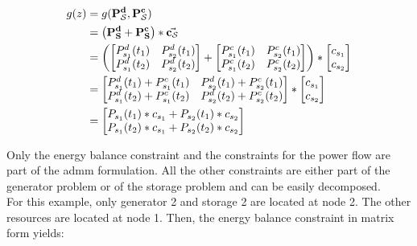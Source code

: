 \begin{subequations}
	\begin{align}
		g(z) &= g(\vb{P_\mathcal{S}^d}, \vb{P_\mathcal{S}^c})\\
		& = \left(\vb{P_S^d} + \vb{P_S^c}\right) * \va{c_\mathcal{S}} \\
		& = \left(\begin{bmatrix}
			P_{s_1}^d(t_1) & P_{s_2}^d(t_1) \\
			P_{s_1}^d(t_2) & P_{s_2}^d(t_2)
		\end{bmatrix} + \begin{bmatrix}
			P_{s_1}^c(t_1) & P_{s_2}^c(t_1) \\
			P_{s_1}^c(t_2) & P_{s_2}^c(t_2)
		\end{bmatrix} \right) * \begin{bmatrix}
			c_{s_1} \\
			c_{s_2}
		\end{bmatrix} \\
		& = \begin{bmatrix}
			P_{s_1}^d(t_1) + P_{s_1}^c(t_1) & P_{s_2}^d(t_1) + P_{s_2}^c(t_1) \\
			P_{s_1}^d(t_2) + P_{s_1}^c(t_2) & P_{s_2}^d(t_2) + P_{s_2}^c(t_2)
		\end{bmatrix} * \begin{bmatrix}
			c_{s_1} \\
			c_{s_2}
		\end{bmatrix} \\
		& = \begin{bmatrix}
			P_{s_1}(t_1) * c_{s_1} + P_{s_2}(t_1) * c_{s_2} \\
			P_{s_1}(t_2) * c_{s_1} + P_{s_2}(t_2) * c_{s_2} \\
		\end{bmatrix}
	\end{align}
\end{subequations}

Only the energy balance constraint and the constraints for the power flow are part of the \gls{admm} formulation. All the other constraints are either part of the generator problem or of the storage problem and can be easily decomposed. \\

For this example, only generator 2 and storage 2 are located at node 2. The other resources are located at node 1. Then, the energy balance constraint in matrix form yields:

